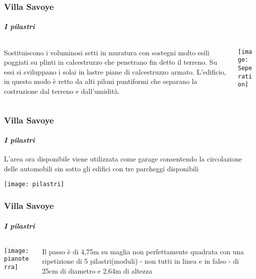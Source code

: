 \documentclass{beamer}
\begin{document}
\usebackgroundtemplate{}

\begin{frame}

\frametitle{Villa Savoye}
\framesubtitle{\textit{I pilastri}}

\begin{columns}
\begin{column}{0.6\textwidth}

Sostituiscono i voluminosi setti in muratura con sostegni molto esili poggiati su plinti in calcestruzzo che penetrano fin detto il terreno. Su essi si sviluppano i solai in lastre piane di calcestruzzo armato. L'edificio, in questo modo è retto da alti piloni puntiformi che separano la costruzione dal terreno e dall'umidità. 
 \end{column}
 
\begin{column}{0.4\textwidth}
  \texttt{[image: Seperation]}
   
 \end{column}
 \end{columns}

 \end{frame}

 \begin{frame}

\frametitle{Villa Savoye}
\framesubtitle{\textit{I pilastri}}

L'area ora disponibile viene utilizzata come garage consentendo la circolazione delle automobili sin sotto gli edifici con tre parcheggi disponibili
 
  \texttt{[image: pilastri]}

 \end{frame}
 
\begin{frame} 

\frametitle{Villa Savoye}
\framesubtitle{\textit{I pilastri}}

\begin{columns}
\begin{column}{0.4\textwidth}
 
\texttt{[image: pianoterra]} 

 \end{column}
 
\begin{column}{0.5\textwidth}

Il passo è di 4,75m su maglia non perfettamente quadrata con una ripetizione di 5 pilastri(moduli) - non tutti in linea e in falso - di 25cm di diametro e 2,64m di altezza

\end{column}
\end{columns}
  
\end{frame}
\end{document}
